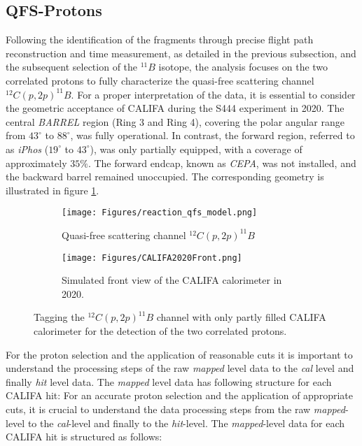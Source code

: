 \subsection{QFS-Protons}
Following the identification of the fragments through precise flight path reconstruction and time measurement, as detailed in the previous subsection, and the subsequent selection of the $^{11}B$ isotope, the analysis focuses on the two correlated protons to fully characterize the quasi-free scattering channel $^{12}C(p,2p)^{11}B$.\newline
For a proper interpretation of the data, it is essential to consider the geometric acceptance of CALIFA during the S444 experiment in 2020. The central \textit{BARREL} region (Ring 3 and Ring 4), covering the polar angular range from $43^{\circ}$ to $88^{\circ}$, was fully operational. In contrast, the forward region, referred to as \textit{iPhos} ($19^{\circ}$ to $43^{\circ}$), was only partially equipped, with a coverage of approximately $35\%$. The forward endcap, known as \textit{CEPA}, was not installed, and the backward barrel remained unoccupied. The corresponding geometry is illustrated in figure \ref{fig:qfs_reac_and_geo}.\newline
\begin{figure}[htpb]
	\begin{subfigure}[t]{.4\linewidth}
    \texttt{[image: Figures/reaction\_qfs\_model.png]}
	\caption{Quasi-free scattering channel $^{12}C(p,2p)^{11}B$}
	\end{subfigure}
	\begin{subfigure}[t]{.4\linewidth}
    \texttt{[image: Figures/CALIFA2020Front.png]}
	\caption{Simulated front view of the CALIFA calorimeter in 2020.}
	\end{subfigure}
    \caption{Tagging the $^{12}C(p,2p)^{11}B$ channel with only partly filled CALIFA calorimeter for the detection of the two correlated protons.}%
    \label{fig:qfs_reac_and_geo}%
\end{figure}
For the proton selection and the application of reasonable cuts it is important to understand the processing steps of the raw \textit{mapped} level data to the \textit{cal} level and finally \textit{hit} level data. The \textit{mapped} level data has following structure for each CALIFA hit:
For an accurate proton selection and the application of appropriate cuts, it is crucial to understand the data processing steps from the raw \textit{mapped}-level to the \textit{cal}-level and finally to the \textit{hit}-level. The \textit{mapped}-level data for each CALIFA hit is structured as follows:
